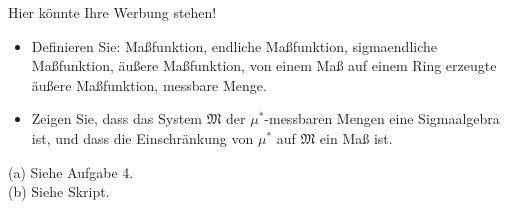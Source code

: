 \begin{exercise}

Hier könnte Ihre Werbung stehen!

\begin{itemize}
  \item[(a)] Definieren Sie: Maßfunktion, endliche Maßfunktion, sigmaendliche Maßfunktion, äußere Maßfunktion, von einem Maß auf einem Ring erzeugte äußere Maßfunktion, messbare Menge.
  \item[(b)] Zeigen Sie, dass das System $\mathfrak{M}$ der $\mu^\ast$-messbaren Mengen eine Sigmaalgebra ist, und dass die Einschränkung von $\mu^\ast$ auf $\mathfrak{M}$ ein Maß ist.
\end{itemize}

\end{exercise}


\begin{solution}

(a) Siehe Aufgabe 4. \\

(b) Siehe Skript.

\end{solution}

